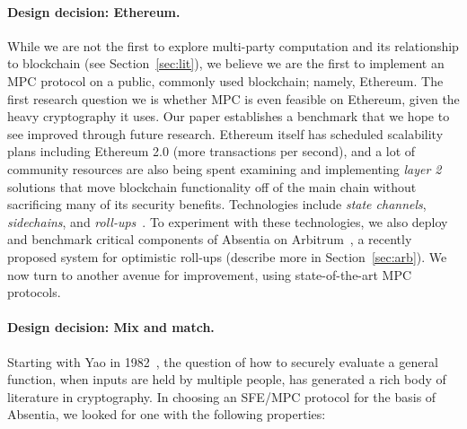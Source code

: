 \paragraph{Design decision: Ethereum.} While we are not the first to explore multi-party computation and its relationship to blockchain (see Section~\ref{sec:lit}), we believe we are the first to implement an MPC protocol on a public, commonly used blockchain; namely, Ethereum. The first research question we is whether MPC is even feasible on Ethereum, given the heavy cryptography it uses. Our paper establishes a benchmark that we hope to see improved through future research. Ethereum itself has scheduled scalability plans including Ethereum 2.0 (more transactions per second), and a lot of community resources are also being spent examining and implementing \emph{layer 2} solutions that move blockchain functionality off of the main chain without sacrificing many of its security benefits. Technologies include \emph{state channels}, \emph{sidechains}, and \emph{roll-ups}~\cite{GMR+20}. To experiment with these technologies, we also deploy and benchmark critical components of Absentia on Arbitrum~\cite{KGCWF18}, a recently proposed system for optimistic roll-ups (describe more in Section~\ref{sec:arb}). We now turn to another avenue for improvement, using state-of-the-art MPC protocols.

\paragraph{Design decision: Mix and match.} Starting with Yao in 1982~\cite{Yao82}, the question of how to securely evaluate a general function, when inputs are held by multiple people, has generated a rich body of literature in cryptography. In choosing an SFE/MPC protocol for the basis of Absentia, we looked for one with the following properties:

